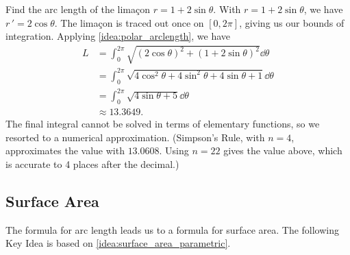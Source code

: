 \begin{example}\label{ex_polcalc7}%
Find the arc length of the limaçon $r=1+2\sin\theta$.
\solution
With $r=1+2\sin\theta$, we have $r\,' = 2\cos\theta$. The limaçon is traced out once on $[0,2\pi]$, giving us our bounds of integration. Applying \autoref{idea:polar_arclength}, we have
\begin{align*}
	L
	&= \int_0^{2\pi} \sqrt{(2\cos\theta)^2+(1+2\sin\theta)^2}\dd\theta \\
	&=	\int_0^{2\pi} \sqrt{4\cos^2\theta+4\sin^2\theta +4\sin\theta+1}\dd\theta\\
	&=	\int_0^{2\pi} \sqrt{4\sin\theta+5}\dd\theta\\
	&\approx 13.3649.
\end{align*}
The final integral cannot be solved in terms of elementary functions, so we resorted to a numerical approximation. (Simpson's Rule, with $n=4$, approximates the value with $13.0608$. Using $n=22$ gives the value above, which is accurate to 4 places after the decimal.)
\end{example}


\vspace{-\topsep}\vspace{-\partopsep}

\subsection{Surface Area}

The formula for arc length leads us to a formula for surface area. The following Key Idea is based on \autoref{idea:surface_area_parametric}.

